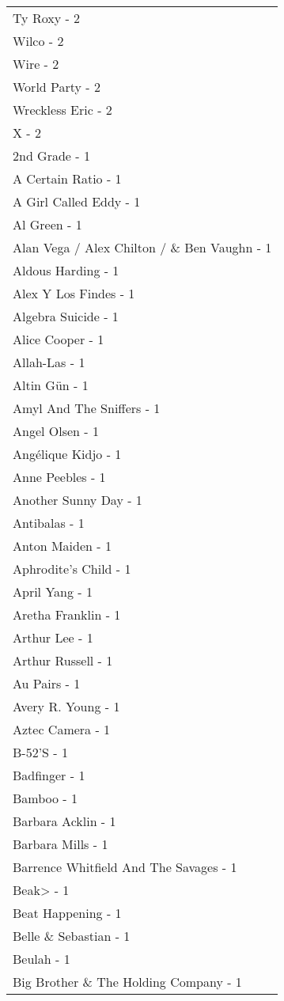 \documentclass[
]{article}
\begin{document}
\begin{longtable}{l}
Ty Roxy - 2 \\ 
Wilco - 2 \\ 
Wire - 2 \\ 
World Party - 2 \\ 
Wreckless Eric - 2 \\ 
X - 2 \\ 
2nd Grade - 1 \\ 
A Certain Ratio - 1 \\ 
A Girl Called Eddy - 1 \\ 
Al Green - 1 \\ 
Alan Vega / Alex Chilton / \& Ben Vaughn - 1 \\ 
Aldous Harding - 1 \\ 
Alex Y Los Findes - 1 \\ 
Algebra Suicide - 1 \\ 
Alice Cooper - 1 \\ 
Allah-Las - 1 \\ 
Altin Gün - 1 \\ 
Amyl And The Sniffers - 1 \\ 
Angel Olsen - 1 \\ 
Angélique Kidjo - 1 \\ 
Anne Peebles - 1 \\ 
Another Sunny Day - 1 \\ 
Antibalas - 1 \\ 
Anton Maiden - 1 \\ 
Aphrodite's Child - 1 \\ 
April Yang - 1 \\ 
Aretha Franklin - 1 \\ 
Arthur Lee - 1 \\ 
Arthur Russell - 1 \\ 
Au Pairs - 1 \\ 
Avery R. Young - 1 \\ 
Aztec Camera - 1 \\ 
B-52'S - 1 \\ 
Badfinger - 1 \\ 
Bamboo - 1 \\ 
Barbara Acklin - 1 \\ 
Barbara Mills - 1 \\ 
Barrence Whitfield And The Savages - 1 \\ 
Beak> - 1 \\ 
Beat Happening - 1 \\ 
Belle \& Sebastian - 1 \\ 
Beulah - 1 \\ 
Big Brother \& The Holding Company - 1 \\ 

\end{longtable}
\end{document}
